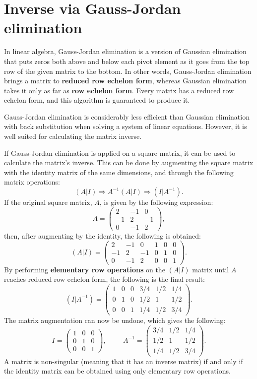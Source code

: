 \documentclass[a4paper, fleqn]{article}
\begin{document}
\section{Inverse via Gauss-Jordan elimination}

In linear algebra, Gauss-Jordan elimination is a version of Gaussian
elimination that puts zeros both above and below each pivot element as
it goes from the top row of the given matrix to the bottom. In other
words, Gauss-Jordan elimination brings a matrix to \textbf{reduced row
echelon form}, whereas Gaussian elimination takes it only as far as
\textbf{row echelon form}. Every matrix has a reduced row echelon
form, and this algorithm is guaranteed to produce it.

Gauss-Jordan elimination is considerably less efficient than Gaussian
elimination with back substitution when solving a system of linear
equations. However, it is well suited for calculating the matrix
inverse.

If Gauss-Jordan elimination is applied on a square matrix, it can be
used to calculate the matrix's inverse. This can be done by augmenting
the square matrix with the identity matrix of the same dimensions, and
through the following matrix operations:
\[
(A|I) \Longrightarrow A^{-1}(A|I) \Longrightarrow (I|A^{-1}).
\]
If the original square matrix, $A$, is given by the following
expression:
\[
A =
\left(\begin{array}{ccc}
2 & -1 & 0 \\
-1 & 2 & -1 \\
0 & -1 & 2
\end{array}\right),
\]
then, after augmenting by the identity, the following is obtained:
\[
(A|I) =
\left(\begin{array}{cccccc}
2 & -1 & 0 & 1 & 0 & 0 \\
-1 & 2 & -1 & 0 & 1 & 0 \\
0 & -1 & 2 & 0 & 0 & 1
\end{array}\right).
\]
By performing \textbf{elementary row operations} on the $(A|I)$ matrix
until $A$ reaches reduced row echelon form, the following is the final
result:
\[
(I|A^{-1}) = 
\left(\begin{array}{cccccc}
1 & 0 & 0 & 3/4 & 1/2 & 1/4 \\
0 & 1 & 0 & 1/2 &  1  & 1/2 \\
0 & 0 & 1 & 1/4 & 1/2 & 3/4
\end{array}\right).
\]
The matrix augmentation can now be undone, which gives the following:
\[
I =
\left(\begin{array}{ccc}
1 & 0 & 0 \\
0 & 1 & 0 \\
0 & 0 & 1
\end{array}\right),
\hspace{1cm}
A^{-1} =
\left(\begin{array}{ccc}
3/4 & 1/2 & 1/4 \\
1/2 &  1  & 1/2 \\
1/4 & 1/2 & 3/4
\end{array}\right).
\]
A matrix is non-singular (meaning that it has an inverse matrix) if
and only if the identity matrix can be obtained using only elementary
row operations.
\end{document}
